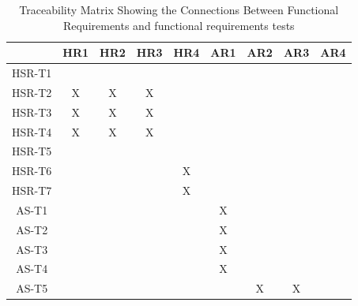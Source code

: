 \documentclass[12pt, titlepage]{article}
\begin{document}
\begin{landscape}
\begin{table}[h!]
\centering
\begin{tabular}{|c|c|c|c|c|c|c|c|c|}
\hline
& HR1 & HR2 & HR3 & HR4 & AR1 & AR2 & AR3 & AR4 \\
\hline
HSR-T1        & & & & & & & & \\ \hline
HSR-T2        &X &X &X & & & & & \\ \hline
HSR-T3        &X &X &X & & & & & \\ \hline
HSR-T4        &X &X &X & & & & & \\ \hline
HSR-T5        & & & & & & & & \\ \hline
HSR-T6        & & & & X& & & & \\ \hline
HSR-T7        & & & & X& & & & \\ \hline
AS-T1         & & & & &X & & & \\ \hline
AS-T2        & & & & &X & & & \\ \hline
AS-T3        & & & & &X & & & \\ \hline
AS-T4        & & & & &X & & & \\ \hline
AS-T5        & & & & & &X &X & \\ \hline
\end{tabular}
\caption{Traceability Matrix Showing the Connections Between Functional Requirements and functional requirements tests}
\label{Table:A_trace}
\end{table}
\end{landscape}
\end{document}
